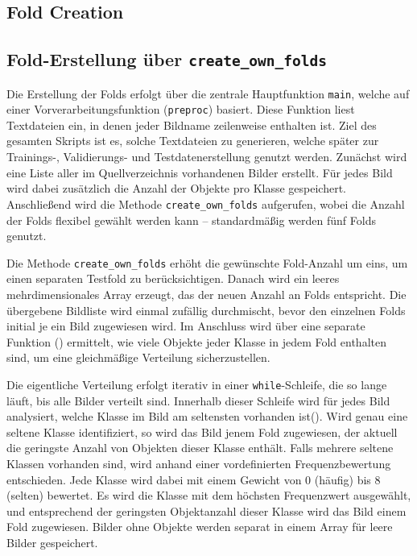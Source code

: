 \subsection{Fold Creation}

\subsection{Fold-Erstellung über \texttt{create\_own\_folds}}

Die Erstellung der Folds erfolgt über die zentrale Hauptfunktion \texttt{main}, welche auf einer Vorverarbeitungsfunktion (\texttt{preproc}) basiert. Diese Funktion liest Textdateien ein, in denen jeder Bildname zeilenweise enthalten ist. Ziel des gesamten Skripts ist es, solche Textdateien zu generieren, welche später zur Trainings-, Validierungs- und Testdatenerstellung genutzt werden. Zunächst wird eine Liste aller im Quellverzeichnis vorhandenen Bilder erstellt. Für jedes Bild wird dabei zusätzlich die Anzahl der Objekte pro Klasse gespeichert. Anschließend wird die Methode \texttt{create\_own\_folds} aufgerufen, wobei die Anzahl der Folds flexibel gewählt werden kann – standardmäßig werden fünf Folds genutzt.

Die Methode \texttt{create\_own\_folds} erhöht die gewünschte Fold-Anzahl um eins, um einen separaten Testfold zu berücksichtigen. Danach wird ein leeres mehrdimensionales Array erzeugt, das der neuen Anzahl an Folds entspricht. Die übergebene Bildliste wird einmal zufällig durchmischt, bevor den einzelnen Folds initial je ein Bild zugewiesen wird. Im Anschluss wird über eine separate Funktion () ermittelt, wie viele Objekte jeder Klasse in jedem Fold enthalten sind, um eine gleichmäßige Verteilung sicherzustellen.

Die eigentliche Verteilung erfolgt iterativ in einer \texttt{while}-Schleife, die so lange läuft, bis alle Bilder verteilt sind. Innerhalb dieser Schleife wird für jedes Bild analysiert, welche Klasse im Bild am seltensten vorhanden ist(). Wird genau eine seltene Klasse identifiziert, so wird das Bild jenem Fold zugewiesen, der aktuell die geringste Anzahl von Objekten dieser Klasse enthält. Falls mehrere seltene Klassen vorhanden sind, wird anhand einer vordefinierten Frequenzbewertung entschieden. Jede Klasse wird dabei mit einem Gewicht von 0 (häufig) bis 8 (selten) bewertet. Es wird die Klasse mit dem höchsten Frequenzwert ausgewählt, und entsprechend der geringsten Objektanzahl dieser Klasse wird das Bild einem Fold zugewiesen. Bilder ohne Objekte werden separat in einem Array für leere Bilder gespeichert.

